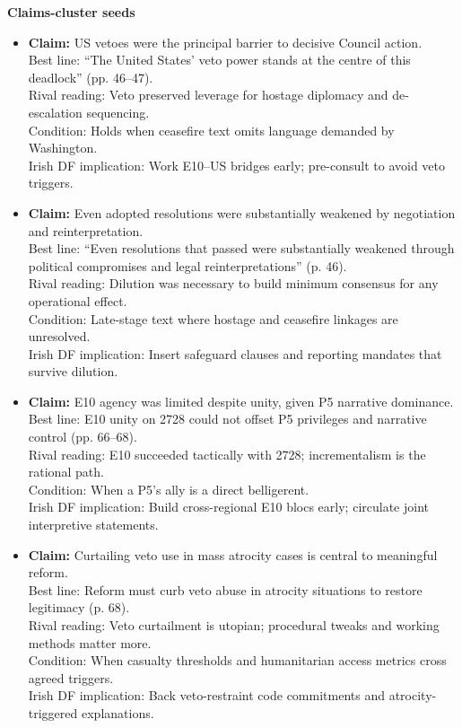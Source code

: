 \textbf{Claims-cluster seeds}
\begin{itemize}
	\item \textbf{Claim:} US vetoes were the principal barrier to decisive Council action.\\
	Best line: “The United States’ veto power stands at the centre of this deadlock” (pp. 46–47).\\
	Rival reading: Veto preserved leverage for hostage diplomacy and de-escalation sequencing.\\
	Condition: Holds when ceasefire text omits language demanded by Washington.\\
	Irish DF implication: Work E10–US bridges early; pre-consult to avoid veto triggers.
	\item \textbf{Claim:} Even adopted resolutions were substantially weakened by negotiation and reinterpretation.\\
	Best line: “Even resolutions that passed were substantially weakened through political compromises and legal reinterpretations” (p. 46).\\
	Rival reading: Dilution was necessary to build minimum consensus for any operational effect.\\
	Condition: Late-stage text where hostage and ceasefire linkages are unresolved.\\
	Irish DF implication: Insert safeguard clauses and reporting mandates that survive dilution.
	\item \textbf{Claim:} E10 agency was limited despite unity, given P5 narrative dominance.\\
	Best line: E10 unity on 2728 could not offset P5 privileges and narrative control (pp. 66–68).\\
	Rival reading: E10 succeeded tactically with 2728; incrementalism is the rational path.\\
	Condition: When a P5’s ally is a direct belligerent.\\
	Irish DF implication: Build cross-regional E10 blocs early; circulate joint interpretive statements.
	\item \textbf{Claim:} Curtailing veto use in mass atrocity cases is central to meaningful reform.\\
	Best line: Reform must curb veto abuse in atrocity situations to restore legitimacy (p. 68).\\
	Rival reading: Veto curtailment is utopian; procedural tweaks and working methods matter more.\\
	Condition: When casualty thresholds and humanitarian access metrics cross agreed triggers.\\
	Irish DF implication: Back veto-restraint code commitments and atrocity-triggered explanations.
\end{itemize}

